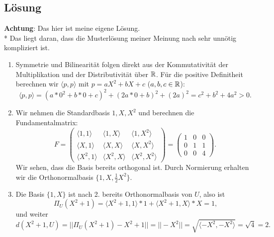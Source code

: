\subsection{Lösung}
\begin{remark}
	\textbf{Achtung}: Das hier ist meine eigene Lösung. \\*
	Das liegt daran, dass die Musterlösung meiner Meinung nach sehr unnötig kompliziert ist.
\end{remark}
\begin{enumerate}
	\item Symmetrie und Bilinearität folgen direkt aus der Kommutativität der Multiplikation und der Distributivität über \( \mathbb{R} \). Für die positive Definitheit berechnen wir \( \langle p,p \rangle \) mit \( p = aX^2+bX+c \) (\( a,b,c \in \mathbb{R} \)):
	\begin{equation*}
		\langle p,p \rangle = (a*0^2+b*0+c)^2 + (2a*0+b)^2 + (2a)^2 = c^2+b^2+4a^2 > 0\text{.}
	\end{equation*}

	\item Wir nehmen die Standardbasis \( 1,X,X^2 \) und berechnen die Fundamentalmatrix:
	\begin{equation*}
		F = \left( \begin{smallmatrix}
			\langle 1,1 \rangle & \langle 1,X \rangle & \langle 1,X^2 \rangle \\
			\langle X,1 \rangle & \langle X,X \rangle & \langle X,X^2 \rangle \\
			\langle X^2,1 \rangle & \langle X^2,X \rangle & \langle X^2,X^2 \rangle
		\end{smallmatrix} \right) = \left( \begin{smallmatrix}
			1 & 0 & 0 \\
			0 & 1 & 1 \\
			0 & 0 & 4
		\end{smallmatrix} \right)\text{.}
	\end{equation*}
	Wir sehen, dass die Basis bereits orthogonal ist. Durch Normierung erhalten wir die Orthonormalbasis \( \{ 1,X,\tfrac{1}{2}X^2 \} \).

	\item Die Basis \( \{ 1,X \} \) ist nach 2. bereits Orthonormalbasis von \( U \), also ist
	\begin{equation*}
		\Pi_U(X^2+1) = \langle X^2+1,1 \rangle*1+\langle X^2+1,X \rangle*X = 1\text{,}
	\end{equation*}
	und weiter
	\begin{equation*}
		d(X^2+1,U) = ||\Pi_U(X^2+1)-X^2+1|| = ||-X^2|| = \sqrt{\langle -X^2,-X^2 \rangle} = \sqrt{4} = 2\text{.}
	\end{equation*}
\end{enumerate}

